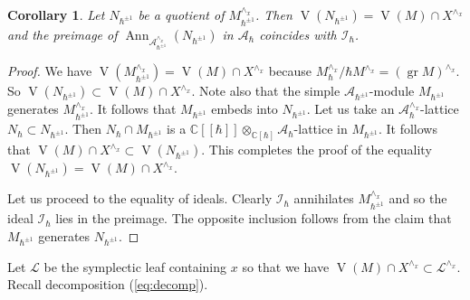 \documentclass[12pt]{amsart}
\newcommand{\A}{\mathcal{A}}
\newcommand{\K}{\mathbb{C}}
\newcommand{\I}{\mathcal{I}}
\newcommand{\VA}{\operatorname{V}}
\newcommand{\gr}{\operatorname{gr}}
\newcommand{\Ann}{\operatorname{Ann}}
\newtheorem{Cor}[Thm]{Corollary}
\theoremstyle{definition}
\begin{document}
\begin{Cor}\label{Cor:compln_quot}
Let $N_{\hbar^{\pm 1}}$ be a quotient of $M_{\hbar^{\pm 1}}^{\wedge_x}$.
Then $\VA(N_{\hbar^{\pm 1}})=\VA(M)\cap X^{\wedge_x}$ and the preimage of
$\Ann_{\A^{\wedge_x}_{\hbar^{\pm 1}}}(N_{\hbar^{\pm 1}})$ in $\A_\hbar$ coincides with $\I_\hbar$.
\end{Cor}
\begin{proof}
We have $\VA(M^{\wedge_x}_{\hbar^{\pm 1}})=\VA(M)\cap X^{\wedge_x}$ because $M^{\wedge_x}_{\hbar}/\hbar M^{\wedge_x}=
(\gr M)^{\wedge_x}$. So $\VA(N_{\hbar^{\pm 1}})\subset \VA(M)\cap X^{\wedge_x}$. Note also that the simple
$\A_{\hbar^{\pm 1}}$-module $M_{\hbar^{\pm 1}}$ generates $M^{\wedge_x}_{\hbar^{\pm 1}}$. It follows that
$M_{\hbar^{\pm 1}}$ embeds into $N_{\hbar^{\pm 1}}$. Let us take an $\A_\hbar^{\wedge_x}$-lattice
$N_\hbar\subset N_{\hbar^{\pm 1}}$. Then $N_\hbar\cap M_{\hbar^{\pm 1}}$ is a $\K[[\hbar]]\otimes_{\K[\hbar]}\A_{\hbar}$-lattice in $M_{\hbar^{\pm 1}}$. It follows that
$\VA(M)\cap X^{\wedge_x}\subset \VA(N_{\hbar^{\pm 1}})$. This completes the proof of the equality
$\VA(N_{\hbar^{\pm 1}})=\VA(M)\cap X^{\wedge_x}$.

Let us proceed to the equality of ideals. Clearly $\I_\hbar$ annihilates $M_{\hbar^{\pm 1}}^{\wedge_x}$
and so the ideal $\I_\hbar$ lies in the preimage. The opposite inclusion follows from
the claim that $M_{\hbar^{\pm 1}}$ generates $N_{\hbar^{\pm 1}}$.
\end{proof}


Let $\mathcal{L}$ be the symplectic leaf containing $x$ so that we have $\VA(M)\cap X^{\wedge_x}\subset \mathcal{L}^{\wedge_x}$. Recall decomposition (\ref{eq:decomp}).
\end{document}
